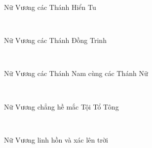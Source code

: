 \documentclass[12pt]{article}
\begin{document}
\begin{paracol}{2}
\begin{rightcolumn}
Nữ Vương các Thánh Hiển Tu\\
\end{rightcolumn}

\begin{leftcolumn*}
\Large{\ \ \ \ }\\			
\end{leftcolumn*}		

\begin{rightcolumn}
Nữ Vương các Thánh Đồng Trinh\\
\end{rightcolumn}

\begin{leftcolumn*}
\Large{\ \ \ \ }\\
\end{leftcolumn*}

\begin{rightcolumn}
Nữ Vương các Thánh Nam cùng các Thánh Nữ\\
\end{rightcolumn}

\begin{leftcolumn*}
\Large{\ \ \ \ \ \ \ }\\
\end{leftcolumn*}

\begin{rightcolumn}
Nữ Vương chẳng hề mắc Tội Tổ Tông\\
\end{rightcolumn}

\begin{leftcolumn*}
\Large{\ \ \ \ \ }\\	
\end{leftcolumn*}

\begin{rightcolumn}
Nữ Vương linh hồn và xác lên trời\\
\end{rightcolumn}

\begin{leftcolumn*}
\Large{\ \ \ \ \ }\\	
\end{leftcolumn*}


\end{paracol}
\end{document}
